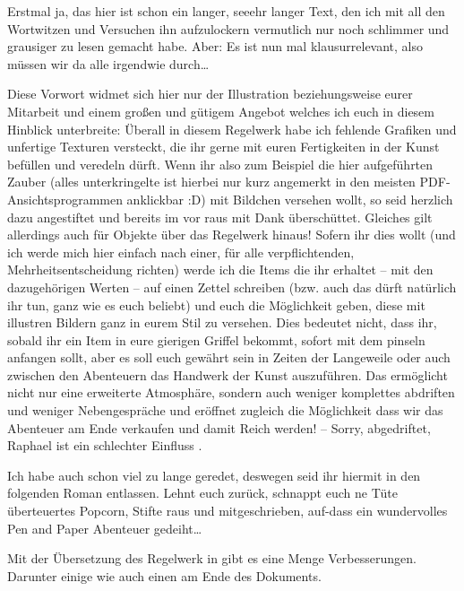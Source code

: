 \label{sec:vorwort}Erstmal ja, das hier ist schon ein langer, seeehr langer Text, den ich mit all den Wortwitzen und Versuchen ihn aufzulockern vermutlich nur noch schlimmer und grausiger zu lesen gemacht habe. Aber: Es ist nun mal klausurrelevant, also müssen wir da alle irgendwie durch\ldots 

Diese Vorwort widmet sich hier nur der Illustration beziehungsweise eurer Mitarbeit und einem großen und gütigem Angebot welches ich euch in diesem Hinblick unterbreite:
Überall in diesem Regelwerk habe ich fehlende Grafiken und unfertige Texturen versteckt, die ihr gerne mit euren Fertigkeiten in der Kunst befüllen und veredeln dürft. Wenn ihr also zum Beispiel die hier aufgeführten Zauber (alles unterkringelte ist hierbei nur kurz angemerkt in den meisten PDF-Ansichtsprogrammen anklickbar :D) mit Bildchen versehen wollt, so seid herzlich dazu angestiftet und bereits im vor raus mit Dank überschüttet.
Gleiches gilt allerdings auch für Objekte über das Regelwerk hinaus! Sofern ihr dies wollt (und ich werde mich hier einfach nach einer, für alle verpflichtenden, Mehrheitsentscheidung richten) werde ich die Items die ihr erhaltet -- mit den dazugehörigen Werten -- auf einen Zettel schreiben (bzw. auch das dürft natürlich ihr tun, ganz wie es euch beliebt) und euch die Möglichkeit geben, diese mit illustren Bildern ganz in eurem Stil zu versehen. Dies bedeutet nicht, dass ihr, sobald ihr ein Item in eure gierigen Griffel bekommt, sofort mit dem pinseln anfangen sollt, aber es soll euch gewährt sein in Zeiten der Langeweile oder auch zwischen den Abenteuern das Handwerk der Kunst auszuführen. Das ermöglicht nicht nur eine erweiterte Atmosphäre, sondern auch weniger komplettes abdriften und weniger Nebengespräche und eröffnet zugleich die Möglichkeit dass wir das Abenteuer am Ende verkaufen und damit Reich werden! -- Sorry, abgedriftet, Raphael ist ein schlechter Einfluss \Laughey.

Ich habe auch schon viel zu lange geredet, deswegen seid ihr hiermit in den folgenden Roman entlassen. Lehnt euch zurück, schnappt euch ne Tüte überteuertes Popcorn, Stifte raus und mitgeschrieben, auf-dass ein wundervolles Pen and Paper Abenteuer gedeiht\ldots


Mit der Übersetzung des Regelwerk in \LaTeXe{} gibt es eine Menge Verbesserungen. Darunter einige  wie auch einen  am Ende des Dokuments.